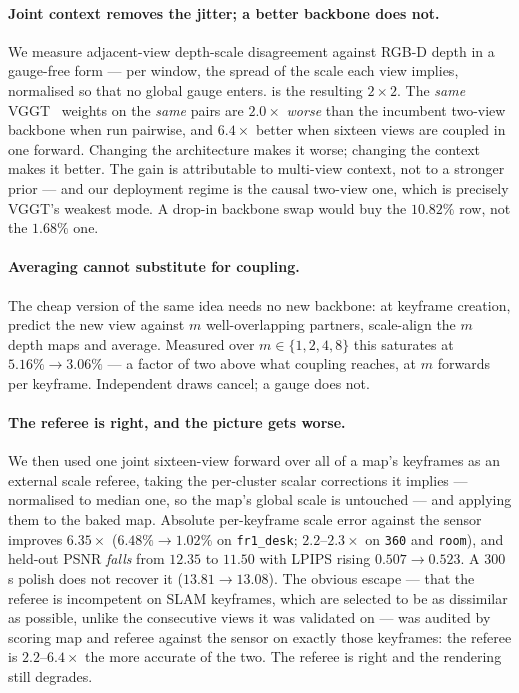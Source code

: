 \paragraph{Joint context removes the jitter; a better backbone does not.}
We measure adjacent-view depth-scale disagreement against RGB-D depth in a
gauge-free form --- per window, the spread of the scale each view implies,
normalised so that no global gauge enters.  is the resulting
$2\times2$. The \emph{same} VGGT~\cite{wang2025vggt} weights on the
\emph{same} pairs are $2.0\times$ \emph{worse} than the incumbent two-view
backbone when run pairwise, and $6.4\times$ better when sixteen views are
coupled in one forward. Changing the architecture makes it worse; changing the
context makes it better. The gain is attributable to multi-view context, not
to a stronger prior --- and our deployment regime is the causal two-view one,
which is precisely VGGT's weakest mode. A drop-in backbone swap would buy the
$10.82\%$ row, not the $1.68\%$ one.

\paragraph{Averaging cannot substitute for coupling.}
The cheap version of the same idea needs no new backbone: at keyframe
creation, predict the new view against $m$ well-overlapping partners,
scale-align the $m$ depth maps and average. Measured over
$m\in\{1,2,4,8\}$ this saturates at $5.16\%\rightarrow3.06\%$ --- a factor of
two above what coupling reaches, at $m$ forwards per keyframe. Independent
draws cancel; a gauge does not.

\paragraph{The referee is right, and the picture gets worse.}
We then used one joint sixteen-view forward over all of a map's keyframes as
an external scale referee, taking the per-cluster scalar corrections it
implies --- normalised to median one, so the map's global scale is untouched
--- and applying them to the baked map. Absolute per-keyframe scale error
against the sensor improves $6.35\times$ ($6.48\%\rightarrow1.02\%$ on
\texttt{fr1\_desk}; $2.2$--$2.3\times$ on \texttt{360} and \texttt{room}),
and held-out PSNR \emph{falls} from $12.35$ to $11.50$\dB{} with LPIPS rising
$0.507\rightarrow0.523$. A $300$\,s polish does not recover it
($13.81\rightarrow13.08$). The obvious escape --- that the referee is
incompetent on SLAM keyframes, which are selected to be as dissimilar as
possible, unlike the consecutive views it was validated on --- was audited by
scoring map and referee against the sensor on exactly those keyframes: the
referee is $2.2$--$6.4\times$ the more accurate of the two. The referee is
right and the rendering still degrades.

